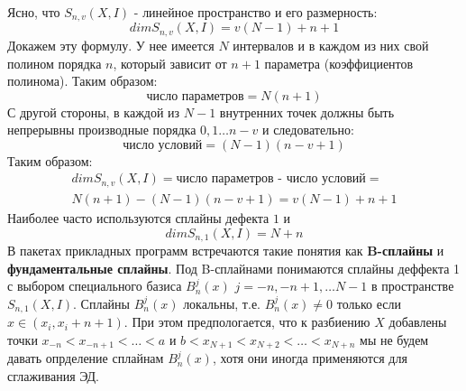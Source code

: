 Ясно, что $S_{n,v}(X,I)$ - линейное пространство и его размерность:
\begin{equation}
dim S_{n,v}(X,I) = v(N-1) +n+1
\end{equation}
Докажем эту формулу. У нее имеется $N$ интервалов и в каждом из них свой полином порядка $n$, который зависит от $n+1$ параметра (коэффициентов полинома). Таким образом:
\begin{equation}
\textit{число параметров} = N(n+1)
\end{equation} 
С другой стороны, в каждой из $N-1$ внутренних точек должны быть непрерывны производные порядка $0,1\ldots n-v$ и следовательно:
\begin{equation}
\textit{число условий} = (N-1)(n-v+1)
\end{equation}
Таким образом:
\begin{equation}
\begin{aligned}dim S_{n,v}(X,I) = \textit{число параметров - число условий} =\\
 N(n+1)-(N-1)(n-v+1)=v(N-1)+n+1\end{aligned}
\end{equation}
Наиболее часто используются сплайны дефекта $1$ и
\begin{equation}
dim  S_{n,1}(X,I) = N+n
\end{equation}
В пакетах прикладных программ встречаются такие понятия как \textbf{B-сплайны} и \textbf{фундаментальные сплайны}. Под B-сплайнами понимаются сплайны деффекта 1 с выбором специального базиса $B_n^j(x)$ $j=-n,-n+1,\ldots N-1$ в пространстве $S_{n,1}(X,I)$. Сплайны $B_n^j(x)$ локальны, т.е.  $B_n^j(x)\neq 0$ только если $x\in(x_i,x_i+n+1)$. При этом предпологается, что к разбиению $X$ добавлены точки $x_{-n}<x_{-n+1}<\ldots<a$ и $b<x_{N+1}<x_{N+2}<\ldots<x_{N+n}$ мы не будем давать опрделение сплайнам $B_n^j(x)$, хотя они иногда применяются для сглаживания ЭД.

